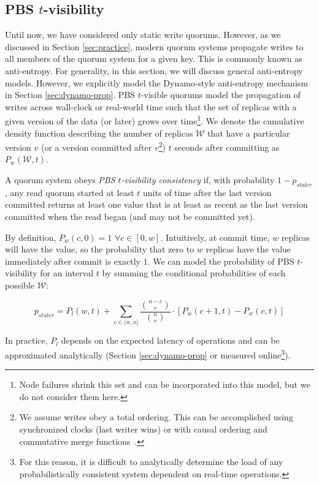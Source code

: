 \documentclass{vldb}
\begin{document}
\subsection{PBS $t$-visibility}

Until now, we have considered only static write quorums.  However, as
we discussed in Section \ref{sec:practice}, modern quorum systems
propagate writes to all members of the quorum system for a given key.
This is commonly known as anti-entropy.  For generality, in this
section, we will discuss general anti-entropy models. However, we
explicitly model the Dynamo-style anti-entropy mechanism in Section
\ref{sec:dynamo-prop}.  PBS $t$-visible quorums model the
propagation of writes across wall-clock or real-world time such that
the set of replicas with a given version of the data (or later) grows
over time\footnote{Node failures shrink this set and can be
  incorporated into this model, but we do not consider them here.}.
We denote the cumulative density function describing the number of
replicas $\mathcal{W}$ that have a particular version $v$ (or a
version committed after $v$\footnote{We assume writes obey a total
  ordering. This can be accomplished using synchronized clocks (last
  writer wins) or with causal ordering and commutative merge
  functions~\cite{cops}.}) $t$ seconds after committing as
$P_w(\mathcal{W}, t)$.

\begin{definition}
A quorum system obeys \textit{PBS $t$-visibility consistency} if, with
probability $1-p_{staler}$, any read quorum started at least $t$ units
of time after the last version committed returns at least one value
that is at least as recent as the last version committed when the read
began (and may not be committed yet).
\end{definition}

By definition, $P_w(c,0) = 1$ $\forall c \in [0, w]$.  Intuitively, at
commit time, $w$ replicas will have the value, so the probability that
zero to $w$ replicas have the value immediately after commit is
exactly $1$.  We can model the probability of PBS $t$-visibility for an interval $t$ by summing the conditional probabilities of each possible $\mathcal{W}$:

\begin{equation}
p_{staler} = P_l(w, t)+\sum_{c\in(w, n]} \frac{{n-c \choose r}}{{n \choose r}}\cdot [P_w(c+1, t)-P_w(c,t)]
\end{equation}

In practice, $P_l$ depends on the expected latency of operations and can be
approximated analytically (Section \ref{sec:dynamo-prop} or measured
online\footnote{For this reason, it is difficult to analytically
  determine the load of any probabilistically consistent system
  dependent on real-time operations.}).
\end{document}
